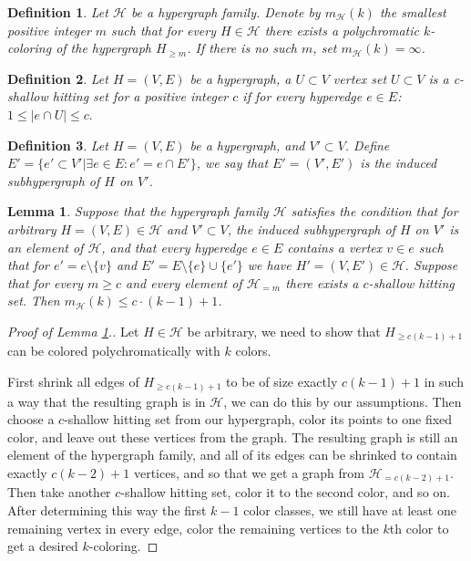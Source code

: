 \documentclass[11pt,oneside]{amsart}
\newcommand{\HH}{\mathcal{H}}
\newtheorem{lemma}{Lemma}
\newtheorem{definition}{Definition}
\begin{document}
\begin{definition} Let $\mathcal{H}$ be a hypergraph family. Denote by $m_\mathcal{H}(k)$ the smallest positive integer $m$ such that for every $H\in\mathcal{H}$ there exists a polychromatic $k$-coloring of the hypergraph $H_{\ge m}$. If there is no such $m$, set $m_{\mathcal{H}}(k)=\infty$.
\end{definition}

\begin{definition}
 Let $H=(V,E)$ be a hypergraph, a $U\subset V$ vertex set $U\subset V$ is a {\it c-shallow hitting set} for a positive integer $c$ if for every hyperedge $e\in E$: $1\le|e\cap U|\le c.$
\end{definition} 

\begin{definition}
 Let $H=(V,E)$ be a hypergraph, and $V'\subset V$. Define $E'=\{e'\subset V'| \exists e\in E: e'=e\cap E'\}$, we say that $E'=(V',E')$ is the induced subhypergraph of $H$ on $V'$.
\end{definition}

\begin{lemma}\label{prop1}
Suppose that the hypergraph family $\mathcal{H}$ satisfies the condition that for arbitrary $H=(V,E)\in\HH$ and $V'\subset V$, the induced subhypergraph of $H$ on $V'$ is an element of $\HH$, and that every hyperedge $e\in E$ contains a vertex $v\in e$ such that for $e'=e\setminus \{v\}$ and $E'=E\setminus \{e\}\cup\{e'\}$ we have $H'=(V,E')\in\HH.$
Suppose that for every $m\ge c$ and every element of $\mathcal{H}_{=m}$ there exists a $c$-shallow hitting set. Then $m_\mathcal{H}(k) \leq c \cdot (k-1) +1$.
\end{lemma}

\begin{proof} [Proof of Lemma \ref{prop1}.] 
Let $H\in\HH$ be arbitrary, we need to show that $H_{\ge c(k-1)+1}$ can be colored polychromatically with $k$ colors.

First shrink all edges of $H_{\ge c(k-1)+1}$ to be of size exactly $c(k-1)+1$ in such a way that the resulting graph is in $\HH$, we can do this by our assumptions.
Then choose a $c$-shallow hitting set from our hypergraph, color its points to one fixed color, and leave out these vertices from the graph. The resulting graph is still an element of the hypergraph family, and all of its edges can be shrinked to contain exactly $c(k-2)+1$ vertices, and so that we get a graph from $\HH_{=c(k-2)+1}$. Then take another $c$-shallow hitting set, color it to the second color, and so on. After determining this way the first $k-1$ color classes, we still have at least one remaining vertex in every edge, color the remaining vertices to the $k$th color to get a desired $k$-coloring.
\end{proof}
\end{document}
